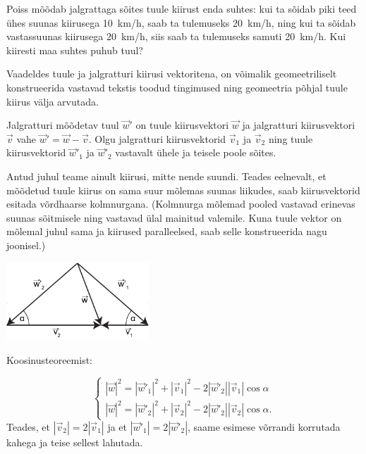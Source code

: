 
Poiss mõõdab jalgrattaga sõites tuule kiirust enda suhtes: kui ta sõidab piki teed ühes
suunas kiirusega \SI{10}{km/h}, saab ta tulemuseks \SI{20}{km/h}, ning kui ta sõidab
vastassuunas kiirusega \SI{20}{km/h}, siis saab ta tulemuseks samuti
\SI{20}{km/h}. Kui kiiresti maa suhtes puhub tuul?

\hint
Vaadeldes tuule ja jalgratturi kiirusi vektoritena, on võimalik geomeetriliselt konstrueerida vastavad tekstis toodud tingimused ning geomeetria põhjal tuule kiirus välja arvutada.

\solu
Jalgratturi mõõdetav tuul $\vec w'$ on tuule kiirusvektori $\vec w$ ja jalgratturi kiirusvektori $\vec v$ vahe $\vec w'=\vec w - \vec v$. Olgu jalgratturi kiirusvektorid $\vec v_1$ ja $\vec v_2$ ning tuule kiirusvektorid $\vec w'_1$ ja $\vec w'_2$ vastavalt ühele ja teisele poole sõites.

Antud juhul teame ainult kiirusi, mitte nende suundi. Teades eelnevalt, et mõõdetud tuule kiirus on sama suur mõlemas suunas liikudes, saab kiirusvektorid esitada võrdhaarse kolmnurgana. (Kolmnurga mõlemad pooled vastavad erinevas suunas sõitmisele ning vastavad ülal mainitud valemile. Kuna tuule vektor on mõlemal juhul sama ja kiirused paralleelsed, saab selle konstrueerida nagu joonisel.)

\begin{center}
\includegraphics[width=0.4\textwidth]{2013-v3g-03-jalgrattur}\\
\end{center}

Koosinusteoreemist: 

$$
\begin{cases}
|\vec w|^2 = |\vec w'_1|^2 + |\vec v_1|^2 - 2 |\vec w'_2| |\vec v_1|\cos \alpha \\
|\vec w|^2 = |\vec w'_2|^2 + |\vec v_2|^2 - 2 |\vec w'_2| |\vec v_2|\cos \alpha.
\end{cases}
$$
Teades, et $ |\vec v_2|=2 |\vec v_1|$ ja et $ |\vec w'_1|=2 |\vec w'_2|$, saame esimese võrrandi korrutada kahega ja teise sellest lahutada.

